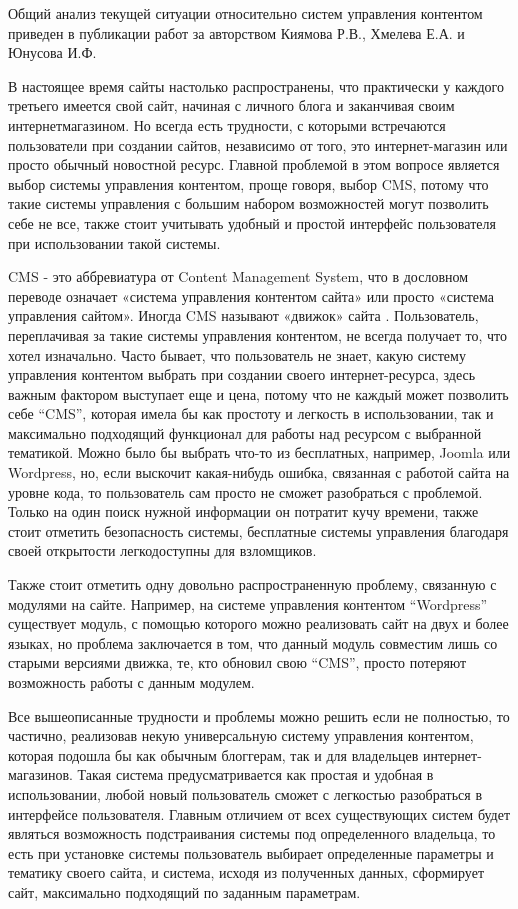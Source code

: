 Общий анализ текущей ситуации относительно систем управления контентом приведен в публикации работ \cite{kiyamov-cms} за авторством Киямова Р.В., Хмелева Е.А. и Юнусова И.Ф.

В настоящее время сайты настолько распространены, что практически у каждого третьего имеется свой сайт, начиная с личного блога и заканчивая своим интернетмагазином.
Но всегда есть трудности, с которыми встречаются пользователи при создании сайтов, независимо от того, это интернет-магазин или просто обычный новостной ресурс.
Главной проблемой в этом вопросе является выбор системы управления контентом, проще говоря, выбор CMS, потому что такие системы управления с большим набором возможностей могут позволить себе не все, также стоит учитывать удобный и простой интерфейс пользователя при использовании
такой системы.

CMS - это аббревиатура от Content Management System, что в дословном переводе означает «система управления контентом сайта» или просто «система управления сайтом».
Иногда CMS называют «движок» сайта \cite{kiyamov-cms-1}.
Пользователь, переплачивая за такие системы управления контентом, не всегда получает то, что хотел изначально.
Часто бывает, что пользователь не знает, какую систему управления контентом выбрать при создании своего интернет-ресурса, здесь важным фактором выступает еще и цена, потому что не каждый может позволить себе “CMS”, которая имела бы как простоту и легкость в использовании, так и максимально подходящий функционал для работы над ресурсом с выбранной тематикой.
Можно было бы выбрать что-то из бесплатных, например, Joomla или Wordpress, но, если выскочит какая-нибудь ошибка, связанная с работой сайта на уровне кода, то пользователь сам просто не сможет разобраться с проблемой.
Только на один поиск нужной информации он потратит кучу времени, также стоит отметить безопасность системы, бесплатные системы управления благодаря своей открытости легкодоступны для взломщиков.

Также стоит отметить одну довольно распространенную проблему, связанную с модулями на сайте.
Например, на системе управления контентом “Wordpress” существует модуль, с помощью которого можно реализовать сайт на двух и более языках, но проблема заключается в том, что данный модуль совместим лишь со старыми версиями движка, те, кто обновил свою “CMS”, просто потеряют возможность работы с данным модулем.

Все вышеописанные трудности и проблемы можно решить если не полностью, то частично, реализовав некую универсальную систему управления контентом, которая подошла бы как обычным блоггерам, так и для владельцев интернет-магазинов.
Такая система предусматривается как простая и удобная в использовании, любой новый пользователь сможет с легкостью разобраться в интерфейсе пользователя.
Главным отличием от всех существующих систем будет являться возможность подстраивания системы под определенного владельца, то есть при установке системы пользователь выбирает определенные параметры и тематику своего сайта, и система, исходя из полученных данных, сформирует сайт, максимально подходящий по заданным параметрам.

